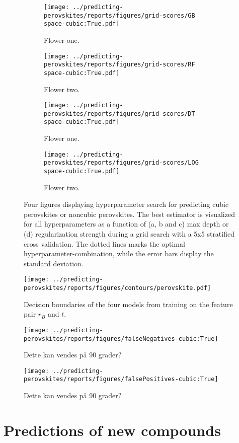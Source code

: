 \clearpage

\begin{figure}[!tbp]
  \begin{subfigure}[b]{0.5\textwidth}
    \texttt{[image: ../predicting-perovskites/reports/figures/grid-scores/GB\\space-cubic:True.pdf]}
    \caption{Flower one.}
    \label{fig:h2-GB}
  \end{subfigure}%
  \hfill
  \begin{subfigure}[b]{0.5\textwidth}
    \texttt{[image: ../predicting-perovskites/reports/figures/grid-scores/RF\\space-cubic:True.pdf]}
    \caption{Flower two.}
    \label{fig:h2-RF}
  \end{subfigure}

  \begin{subfigure}[b]{0.5\textwidth}
    \texttt{[image: ../predicting-perovskites/reports/figures/grid-scores/DT\\space-cubic:True.pdf]}
    \caption{Flower one.}
    \label{fig:h2-DT}
  \end{subfigure}%
  \hfill
  \begin{subfigure}[b]{0.5\textwidth}
    \texttt{[image: ../predicting-perovskites/reports/figures/grid-scores/LOG\\space-cubic:True.pdf]}
    \caption{Flower two.}
    \label{fig:h2-LOG}
  \end{subfigure}
  \caption{Four figures displaying hyperparameter search for predicting cubic perovskites or noncubic perovskites. The best estimator is visualized for all hyperparameters as a function of (a, b and c) max depth or (d) regularization strength during a grid search with a 5x5 stratified cross validation. The dotted lines marks the optimal hyperparameter-combination, while the error bars display the standard deviation. }
\end{figure}

\clearpage

\begin{figure}[!tbp]
  \centering
  \texttt{[image: ../predicting-perovskites/reports/figures/contours/perovskite.pdf]}
  \caption{Decision boundaries of the four models from training on the feature pair $r_B$ and $t$.}
  \label{fig:decision-boundaries}
\end{figure}

\begin{figure}[!tbp]
  \texttt{[image: ../predicting-perovskites/reports/figures/falseNegatives-cubic:True]}
  \caption{Dette kan vendes på 90 grader?}
  \label{fig:h2-fn}
\end{figure}

\begin{figure}[!tbp]
  \texttt{[image: ../predicting-perovskites/reports/figures/falsePositives-cubic:True]}
  \caption{Dette kan vendes på 90 grader?}
  \label{fig:h2-fp}
\end{figure}



\section{Predictions of new compounds}
